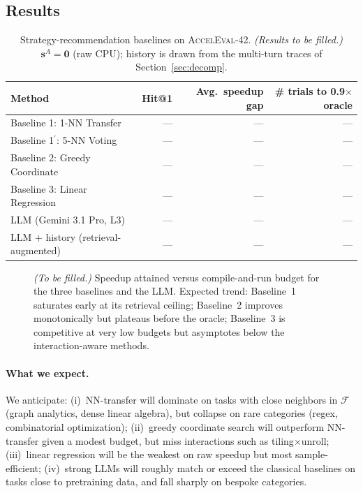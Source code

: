 \documentclass{article}
\begin{document}
\subsection{Results}
\label{sec:strategy-results}

\begin{table}[ht]
\centering
\small
\caption{Strategy-recommendation baselines on \textsc{AccelEval}-42.
\emph{(Results to be filled.)} $\mathbf{s}^A = \mathbf{0}$ (raw CPU);
history is drawn from the multi-turn traces of
Section~\ref{sec:decomp}.}
\label{tab:strategy}
\begin{tabular}{@{}lrrr@{}}
\toprule
\textbf{Method} & \textbf{Hit@1} & \textbf{Avg.\ speedup gap} & \textbf{\# trials to 0.9$\times$oracle} \\
\midrule
Baseline 1: 1-NN Transfer       & --- & --- & --- \\
Baseline 1$^\prime$: 5-NN Voting & --- & --- & --- \\
Baseline 2: Greedy Coordinate    & --- & --- & --- \\
Baseline 3: Linear Regression    & --- & --- & --- \\
\midrule
LLM (Gemini 3.1 Pro, L3)          & --- & --- & --- \\
LLM + history (retrieval-augmented) & --- & --- & --- \\
\bottomrule
\end{tabular}
\end{table}

\begin{figure}[ht]
\centering
\caption{\emph{(To be filled.)} Speedup attained versus
compile-and-run budget for the three baselines and the LLM.
Expected trend: Baseline~1 saturates early at its retrieval ceiling;
Baseline~2 improves monotonically but plateaus before the oracle;
Baseline~3 is competitive at very low budgets but asymptotes below
the interaction-aware methods.}
\label{fig:strategy-budget}
\end{figure}

\paragraph{What we expect.}
We anticipate: (i)~NN-transfer will dominate on tasks with close
neighbors in $\mathcal{F}$ (graph analytics, dense linear algebra),
but collapse on rare categories (regex, combinatorial optimization);
(ii)~greedy coordinate search will outperform NN-transfer given
a modest budget, but miss interactions such as tiling$\times$unroll;
(iii)~linear regression will be the weakest on raw speedup but most
sample-efficient; (iv)~strong LLMs will roughly match or exceed the
classical baselines on tasks close to pretraining data, and fall
sharply on bespoke categories.
\end{document}
